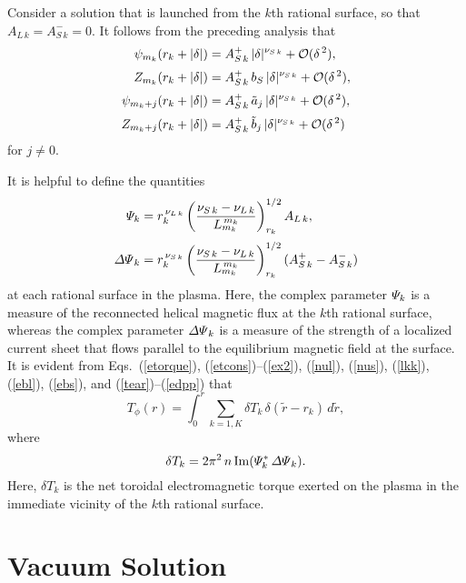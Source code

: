 \documentclass[12pt,prb,aps]{revtex4-1}
\begin{document}
Consider a solution that is launched from the $k$th rational surface, so that $A_{L\,k} = A_{S\,k}^-=0$. It follows from the preceding analysis that
\begin{align}\label{l1}
\psi_{m_k}(r_k+|\delta|) &= A_{S\,k}^+\,|\delta|^{\nu_{S\,k}}+ {\cal O}(\delta^{\,2}),\\[0.5ex]
Z_{m_k}(r_k+|\delta|) &= A_{S\,k}^+\,b_S\,|\delta|^{\nu_{S\,k}}+ {\cal O}(\delta^{\,2}),\\[0.5ex]
\psi_{m_k+j}(r_k+|\delta|)& = A_{S\,k}^+\,\tilde{a}_j\,|\delta|^{\nu_{S\,k}}+ {\cal O}(\delta^{\,2}),\\[0.5ex]
Z_{m_k+j}(r_k+|\delta|) &= A_{S\,k}^+\,\tilde{b}_j\,|\delta|^{\nu_{S\,k}}+ {\cal O}(\delta^{\,2})\label{l2}
\end{align}
for $j\neq 0$. 

It is helpful to define the quantities\,\cite{am1}
\begin{align}\label{Psidef}
{\mit\Psi}_k&= r_k^{\,\nu_{L\,k}}\left(\frac{\nu_{S\,k}-\nu_{L\,k}}{L_{m_k}^{\,{m_k}}}\right)^{1/2}_{r_k} A_{L\,k},\\[0.5ex]
{\mit\Delta\Psi}_k &= r_k^{\,\nu_{S\,k}}\left(\frac{\nu_{S\,k}-\nu_{L\,k}}{L_{m_k}^{\,m_k}}\right)^{1/2}_{r_k} (A_{S\,k}^+ - A_{S\,k}^-)\label{edpp}
\end{align}
at each rational surface in the plasma. Here, the complex parameter ${\mit\Psi}_k$ is a measure of the reconnected helical magnetic flux at the $k$th rational surface, whereas
the complex parameter ${\mit\Delta\Psi}_k$ is a measure of the strength of a localized current sheet that flows parallel to the equilibrium magnetic field at the surface. 
It is evident from Eqs.~(\ref{etorque}), (\ref{etcons})--(\ref{ex2}), (\ref{nul}), (\ref{nus}), (\ref{lkk}), (\ref{ebl}), (\ref{ebs}), and (\ref{tear})--(\ref{edpp}) that\,\cite{am1,am3}
\begin{equation}\label{e204z}
T_\phi(r) =\int_0^r \sum_{k=1,K}\delta T_k\,\delta(\tilde{r}-r_k)\,d\tilde{r},
\end{equation}
where
\begin{equation}\label{e194t}
\delta T_k = 2\pi^2\,n\,{\rm Im}({\mit\Psi}_k^\ast\,{\mit\Delta\Psi}_k).
\end{equation}
Here, $\delta T_k$ is the net toroidal electromagnetic torque exerted on the plasma in the immediate vicinity of the $k$th rational
surface. 

\section{Vacuum Solution}\label{vacxx}
\end{document}
